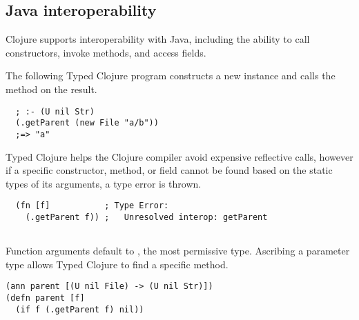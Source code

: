 \subsection{Java interoperability}
\label{sec:overviewjavainterop}

Clojure supports interoperability with Java, including the ability to
call constructors, invoke methods, and access fields.

The following Typed Clojure program constructs a new 
instance and calls the  method on the result.

\begin{exmp}
\begin{verbatim}
  ; :- (U nil Str)
  (.getParent (new File "a/b"))  
  ;=> "a"
\end{verbatim}
\label{example:getparent-direct-constructor}
\end{exmp}

Typed Clojure helps the Clojure compiler avoid expensive reflective 
calls,
however if a specific constructor, method, or field cannot be found based on the
static types of its arguments, a type error is thrown.

\begin{verbatim}
  (fn [f]           ; Type Error:                    
    (.getParent f)) ;   Unresolved interop: getParent
                    
\end{verbatim}

Function arguments default to , the most permissive type. Ascribing
a parameter type allows Typed Clojure to find a specific method.


\begin{exmp}
\begin{verbatim}
(ann parent [(U nil File) -> (U nil Str)])
(defn parent [f]
  (if f (.getParent f) nil))
\end{verbatim}
\label{example:parent-if}
\end{exmp}


